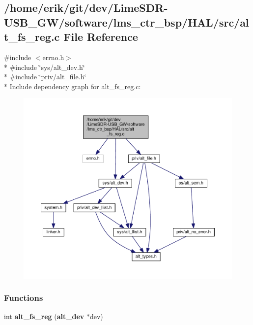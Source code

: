 \subsection{/home/erik/git/dev/\+Lime\+S\+D\+R-\/\+U\+S\+B\+\_\+\+G\+W/software/lms\+\_\+ctr\+\_\+bsp/\+H\+A\+L/src/alt\+\_\+fs\+\_\+reg.c File Reference}
\label{alt__fs__reg_8c}
{\ttfamily \#include $<$errno.\+h$>$}\\*
{\ttfamily \#include \char`\"{}sys/alt\+\_\+dev.\+h\char`\"{}}\\*
{\ttfamily \#include \char`\"{}priv/alt\+\_\+file.\+h\char`\"{}}\\*
Include dependency graph for alt\+\_\+fs\+\_\+reg.\+c\+:
\nopagebreak
\begin{figure}[H]
\begin{center}
\leavevmode
\includegraphics[width=350pt]{d8/d16/alt__fs__reg_8c__incl}
\end{center}
\end{figure}
\subsubsection*{Functions}
\begin{DoxyCompactItemize}
\item 
int {\bf alt\+\_\+fs\+\_\+reg} ({\bf alt\+\_\+dev} $\ast$dev)
\end{DoxyCompactItemize}


